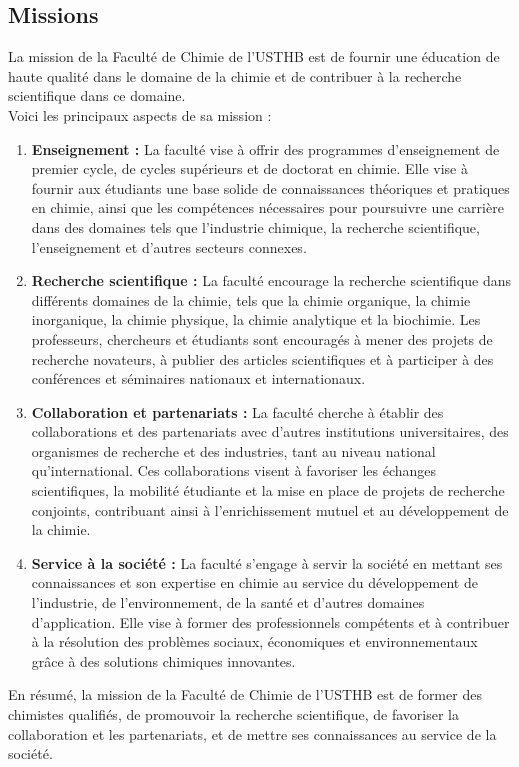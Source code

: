 \subsection{Missions}
La mission de la Faculté de Chimie de l'USTHB est de fournir une éducation de haute qualité dans le domaine de la chimie et de contribuer à la recherche scientifique dans ce domaine.\\
Voici les principaux aspects de sa mission :
  \begin{enumerate}
    \item \textbf{\large Enseignement :} La faculté vise à offrir des programmes d'enseignement de premier cycle, de cycles supérieurs et de doctorat en chimie. Elle vise à fournir aux étudiants une base solide de connaissances théoriques et pratiques en chimie, ainsi que les compétences nécessaires pour poursuivre une carrière dans des domaines tels que l'industrie chimique, la recherche scientifique, l'enseignement et d'autres secteurs connexes.

    \item \textbf{\large Recherche scientifique :} La faculté encourage la recherche scientifique dans différents domaines de la chimie, tels que la chimie organique, la chimie inorganique, la chimie physique, la chimie analytique et la biochimie. Les professeurs, chercheurs et étudiants sont encouragés à mener des projets de recherche novateurs, à publier des articles scientifiques et à participer à des conférences et séminaires nationaux et internationaux.

    \item \textbf{\large Collaboration et partenariats :} La faculté cherche à établir des collaborations et des partenariats avec d'autres institutions universitaires, des organismes de recherche et des industries, tant au niveau national qu'international. Ces collaborations visent à favoriser les échanges scientifiques, la mobilité étudiante et la mise en place de projets de recherche conjoints, contribuant ainsi à l'enrichissement mutuel et au développement de la chimie.

    \item \textbf{\large Service à la société :} La faculté s'engage à servir la société en mettant ses connaissances et son expertise en chimie au service du développement de l'industrie, de l'environnement, de la santé et d'autres domaines d'application. Elle vise à former des professionnels compétents et à contribuer à la résolution des problèmes sociaux, économiques et environnementaux grâce à des solutions chimiques innovantes.
  
  \end{enumerate}
En résumé, la mission de la Faculté de Chimie de l'USTHB est de former des chimistes qualifiés,
de promouvoir la recherche scientifique, de favoriser la collaboration et les partenariats,
et de mettre ses connaissances au service de la société.
